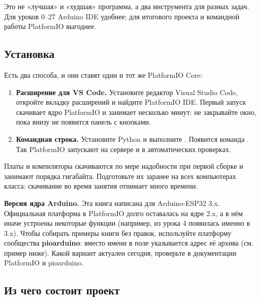 Это не «лучшая» и «худшая» программа, а два инструмента для разных задач. Для уроков 0--27
Arduino IDE удобнее; для итогового проекта и командной работы PlatformIO выгоднее.

\subsection{Установка}

Есть два способа, и они ставят один и тот же PlatformIO Core:
\begin{enumerate}
  \item \textbf{Расширение для VS Code.} Установите редактор Visual Studio Code, откройте
        вкладку расширений и найдите \textsf{PlatformIO IDE}. Первый запуск скачивает ядро
        PlatformIO и занимает несколько минут: не закрывайте окно, пока внизу не появится
        панель с кнопками.
  \item \textbf{Командная строка.} Установите Python и выполните .
        Появится команда . Так PlatformIO запускают на сервере и в автоматических проверках.
\end{enumerate}
Платы и компиляторы скачиваются по мере надобности при первой сборке и занимают
порядка гигабайта. Подготовьте их заранее на всех компьютерах класса: скачивание во время занятия
отнимает много времени.

\begin{caution}
\textbf{Версия ядра Arduino.} Эта книга написана для Arduino-ESP32 3.x. Официальная платформа
 в PlatformIO долго оставалась на ядре 2.x, а в нём иначе устроены некоторые
функции (например,  из урока 4 появилась именно в 3.x). Чтобы собирать примеры
книги без правок, используйте платформу сообщества \textbf{pioarduino}: вместо имени
 в поле  указывается адрес её архива (см. пример ниже).
Какой вариант актуален сегодня, проверьте в документации PlatformIO и pioarduino.
\end{caution}

\subsection{Из чего состоит проект}

